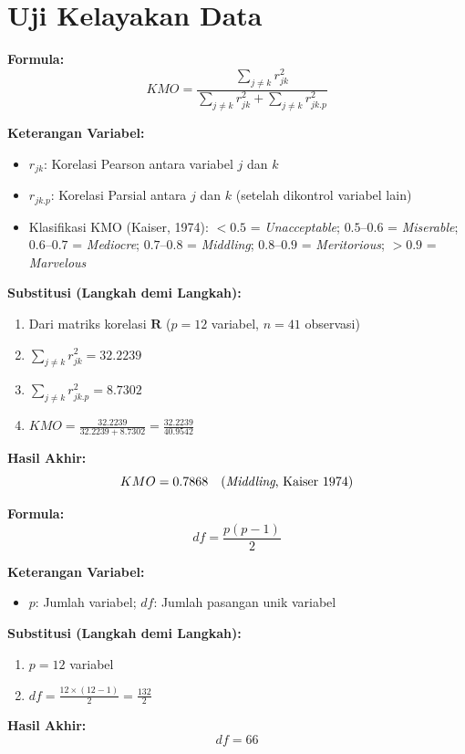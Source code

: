 \documentclass[11pt,a4paper]{article}
\begin{document}
\section{Uji Kelayakan Data}
\begin{tcolorbox}[formula_box, title={10. Kaiser-Meyer-Olkin (KMO)}]
\textbf{Formula:}
\[ KMO = \frac{\sum_{j \neq k} r_{jk}^2}{\sum_{j \neq k} r_{jk}^2 + \sum_{j \neq k} r_{jk.p}^2} \]

\textbf{Keterangan Variabel:}
\begin{itemize}
  \item $r_{jk}$: Korelasi Pearson antara variabel $j$ dan $k$
  \item $r_{jk.p}$: Korelasi Parsial antara $j$ dan $k$ (setelah dikontrol variabel lain)
  \item Klasifikasi KMO (Kaiser, 1974): $<0.5$ = \textit{Unacceptable}; $0.5$--$0.6$ = \textit{Miserable}; $0.6$--$0.7$ = \textit{Mediocre}; $0.7$--$0.8$ = \textit{Middling}; $0.8$--$0.9$ = \textit{Meritorious}; $>0.9$ = \textit{Marvelous}
\end{itemize}

\textbf{Substitusi (Langkah demi Langkah):}
\begin{enumerate}
  \item Dari matriks korelasi $\mathbf{R}$ ($p=12$ variabel, $n=41$ observasi)
  \item $\sum_{j\neq k} r_{jk}^2 = 32.2239$
  \item $\sum_{j\neq k} r_{jk.p}^2 = 8.7302$
  \item $KMO = \frac{32.2239}{32.2239 + 8.7302} = \frac{32.2239}{40.9542}$
\end{enumerate}

\textbf{Hasil Akhir:}
\[ KMO = 0.7868 \quad \text{(\textit{Middling}, Kaiser 1974)} \]
\end{tcolorbox}

\begin{tcolorbox}[formula_box, title={11. Derajat Kebebasan Uji Bartlett ($df$)}]
\textbf{Formula:}
\[ df = \frac{p(p-1)}{2} \]

\textbf{Keterangan Variabel:}
\begin{itemize}
  \item $p$: Jumlah variabel; $df$: Jumlah pasangan unik variabel
\end{itemize}

\textbf{Substitusi (Langkah demi Langkah):}
\begin{enumerate}
  \item $p = 12$ variabel
  \item $df = \frac{12 \times (12-1)}{2} = \frac{132}{2}$
\end{enumerate}

\textbf{Hasil Akhir:}
\[ df = 66 \]
\end{tcolorbox}
\end{document}
